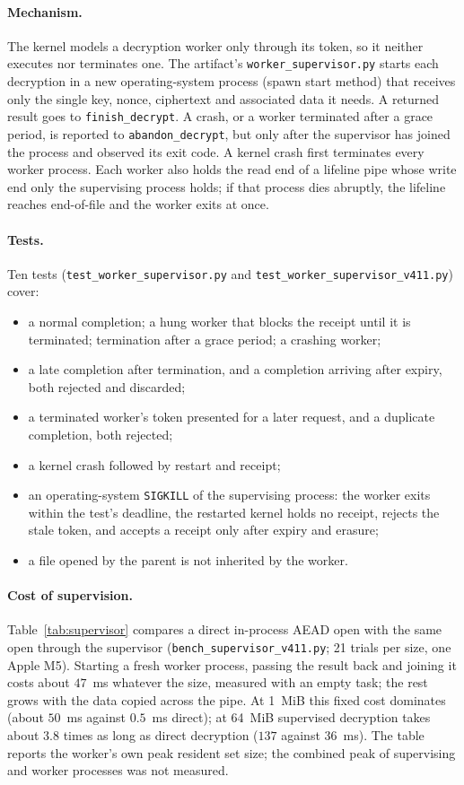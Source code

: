 \documentclass[pdflatex,sn-mathphys-num]{sn-jnl}
\newcommand{\code}[1]{\texttt{#1}}
\newcommand{\fpath}[1]{\nolinkurl{#1}}%
\theoremstyle{plain}
\begin{document}
\paragraph{Mechanism.}
The kernel models a decryption worker only through its token, so it neither executes nor terminates one. The artifact's \code{worker\_supervisor.py} starts each decryption in a new operating-system process (spawn start method) that receives only the single key, nonce, ciphertext and associated data it needs. A returned result goes to \code{finish\_decrypt}. A crash, or a worker terminated after a grace period, is reported to \code{abandon\_decrypt}, but only after the supervisor has joined the process and observed its exit code. A kernel crash first terminates every worker process. Each worker also holds the read end of a lifeline pipe whose write end only the supervising process holds; if that process dies abruptly, the lifeline reaches end-of-file and the worker exits at once.


\paragraph{Tests.}
Ten tests (\fpath{test_worker_supervisor.py} and \fpath{test_worker_supervisor_v411.py}) cover:
\begin{itemize}
\item a normal completion; a hung worker that blocks the receipt until it is terminated; termination after a grace period; a crashing worker;
\item a late completion after termination, and a completion arriving after expiry, both rejected and discarded;
\item a terminated worker's token presented for a later request, and a duplicate completion, both rejected;
\item a kernel crash followed by restart and receipt;
\item an operating-system \code{SIGKILL} of the supervising process: the worker exits within the test's deadline, the restarted kernel holds no receipt, rejects the stale token, and accepts a receipt only after expiry and erasure;
\item a file opened by the parent is not inherited by the worker.
\end{itemize}

\paragraph{Cost of supervision.}
Table~\ref{tab:supervisor} compares a direct in-process AEAD open with the same open through the supervisor (\code{bench\_supervisor\_v411.py}; 21 trials per size, one Apple M5). Starting a fresh worker process, passing the result back and joining it costs about $47$~ms whatever the size, measured with an empty task; the rest grows with the data copied across the pipe. At 1~MiB this fixed cost dominates (about $50$~ms against $0.5$~ms direct); at 64~MiB supervised decryption takes about $3.8$ times as long as direct decryption ($137$ against $36$~ms). The table reports the worker's own peak resident set size; the combined peak of supervising and worker processes was not measured.
\end{document}
